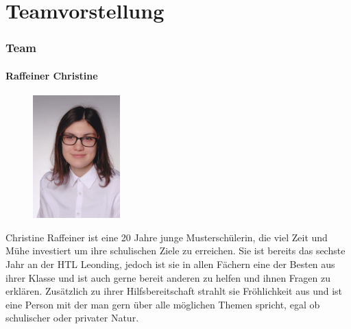 \chapter{Teamvorstellung}
\subsection{Team}
\subsubsection{Raffeiner Christine}
\begin{figure}
    \begin{center}
      \includegraphics[width=0.3\textwidth]{pics/Chrissy.jpg}
    \end{center}
\end{figure}
Christine Raffeiner ist eine 20 Jahre junge Musterschülerin, die viel Zeit und Mühe investiert um ihre 
schulischen Ziele zu erreichen. Sie ist bereits das sechste Jahr an der HTL Leonding, jedoch ist sie in 
allen Fächern eine der Besten aus ihrer Klasse und ist auch gerne bereit anderen zu helfen und ihnen 
Fragen zu erklären. Zusätzlich zu ihrer Hilfsbereitschaft strahlt sie Fröhlichkeit aus und ist eine Person 
mit der man gern über alle möglichen Themen spricht, egal ob schulischer oder privater Natur.
\newline
